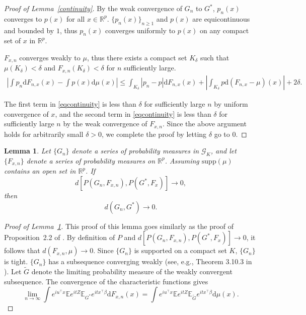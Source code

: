 \documentclass[11pt]{article}
\numberwithin{equation}{section}
\newtheorem{lemma}{Lemma}[section]
\newcommand{\RS}{\mathbb{R}}
\newcommand{\T}{ \top }
\newcommand{\E}{\mathbb{E}}
\begin{document}
\begin{appendices}
\begin{proof}[Proof of Lemma~\ref{continuity}]
By the weak convergence of $G_n$ to $G^*$, $p_n(x)$ converges to $p(x)$ for all $x\in \RS^p$. $\{p_n(x)\}_{n\geq 1}$ and $p(x)$ are equicontinuous and bounded by $1$, thus $p_n(x)$ converges uniformly to $p(x)$ on any compact set of $x$ in $\RS^p$. 

$F_{x,n}$ converges weakly to $\mu$, thus there exists a compact set $K_\delta$ such that $\mu(K_\delta)<\delta$ and $F_{x,n}(K_\delta)<\delta$ for $n$ sufficiently large.
\begin{equation}
\label{eqcontinuity}
\begin{split}
\left|\int p_n \mathrm{d} F_{n,x}(x) - \int p(x) \mathrm{d} \mu(x)\right| \leq  \int_{K_\delta} |p_n -p|\mathrm{d} F_{n,x}(x) + \left|\int_{K_\delta} p \mathrm{d} (F_{n,x} - \mu)(x) \right|+2\delta.
\end{split}
\end{equation}

The first term in \eqref{eqcontinuity} is less than $\delta$ for sufficiently large $n$ by uniform convergence of $x$, and the second term in \eqref{eqcontinuity} is less than $\delta$ for sufficiently large $n$ by the weak convergence of $F_{x,n}$. Since the above argument holds for arbitrarily small $\delta>0$, we complete the proof by letting $\delta$ go to $0$.

\end{proof}

\begin{lemma}
\label{strongid} Let
$\{ G_{n}\}$ denote a series of probability measures in $\mathcal{G}_K$, and let $\{F_{x,n}\}$ denote a series of probability measures on $\RS^p$. Assuming $\mathrm{supp}(\mu)$ contains an open set in $\RS^p$. If
\[
d[P(G_n, F_{x,n}), P(G^*, F_{x})] \rightarrow 0,
\]
then
\[
d(G_{n},G^*) \rightarrow 0.
\]
\end{lemma}
\begin{proof}[Proof of Lemma~\ref{strongid}]
This proof of this lemma goes similarly as the proof of Proposition~2.2 of \cite{beran1994minimum}.
By definition of $P$ and $d[P(G_n, F_{x,n}), P(G^*, F_{x})] \rightarrow 0$, it follows that $d(F_{x,n}, \mu) \rightarrow 0$. Since $\{G_n\}$ is supported on a compact set $K$, $\{G_n\}$ is tight. $\{G_n\}$ has a subsequence converging weakly (see, e.g., Theorem 3.10.3 in \citet{durrett2019probability}). Let $\tilde{G}$ denote the limiting probability measure of the weakly convergent subsequence. The convergence of the characteristic functions gives
\[
\lim_{n\rightarrow \infty}\int e^{iu^\T x} \E e^{itZ} \E_{G^*}e^{itx^\T \beta} \mathrm{d} F_{x,n}(x) = \int e^{iu^\T x} \E e^{itZ} \E_{\tilde{G}}e^{itx^\T \beta} \mathrm{d}\mu(x).
\]


\end{proof}
\end{appendices}
\end{document}
